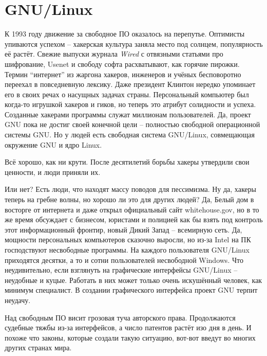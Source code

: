 

\chapter{GNU/Linux}

К 1993 году движение за свободное ПО оказалось на перепутье. Оптимисты упиваются успехом -- хакерская культура заняла место под солнцем, популярность её растёт. Свежие выпуски журнала \textit{Wired} с отвязными статьями про шифрование, Usenet и свободу софта расхватывают, как горячие пирожки. Термин \enquote{интернет} из жаргона хакеров, инженеров и учёных бесповоротно переехал в повседневную лексику. Даже президент Клинтон нередко упоминает его в своих речах о насущных задачах страны. Персональный компьютер был когда-то игрушкой хакеров и гиков, но теперь это атрибут солидности и успеха. Созданные хакерами программы служат миллионам пользователей. Да, проект GNU пока не достиг своей конечной цели -- полностью свободной операционной системы GNU. Но у людей есть свободная система GNU/Linux, совмещающая окружение GNU и ядро Linux.

Всё хорошо, как ни крути. После десятилетий борьбы хакеры утвердили свои ценности, и люди приняли их.

Или нет? Есть люди, что находят массу поводов для пессимизма. Ну да, хакеры теперь на гребне волны, но хорошо ли это для других людей? Да, Белый дом в восторге от интернета и даже открыл официальный сайт whitehouse.gov, но в то же время обсуждает с бизнесом, юристами и полицией как бы взять под контроль этот информационный фронтир, новый Дикий Запад -- всемирную сеть. Да, мощности персональных компьютеров сказочно выросли, но из-за Intel на ПК господствуют несвободные программы. На каждого пользователя GNU/Linux приходятся десятки, а то и сотни пользователей несвободной Windows. Что неудивительно, если взглянуть на графические интерфейсы GNU/Linux -- неудобные и куцые. Работать в них может только очень искушённый человек, как минимум специалист. В создании графического интерфейса проект GNU терпит неудачу.

Над свободным ПО висит грозовая туча авторского права. Продолжаются судебные тяжбы из-за интерфейсов, а число патентов растёт изо дня в день. И похоже что законы, которые создали такую ситуацию, вот-вот введут во многих других странах мира.

